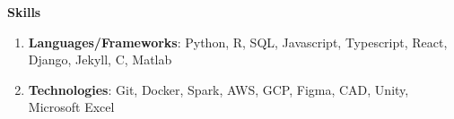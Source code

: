 \documentclass[letterpaper,11pt]{article}
\newlength{\outerbordwidth}
\newcommand{\resheading}[1]{\vspace{0pt} %
  \parbox{\textwidth}{\setlength{\FrameSep}{\outerbordwidth}
    \begin{shaded}
\setlength{\fboxsep}{0pt}\framebox[\textwidth][l]{\setlength{\fboxsep}{3.5pt}\fcolorbox{shadecolorB}{shadecolorB}{\textbf{\sffamily{\mbox{~}\makebox[7.262in][l]{\large #1} \vphantom{p\^{E}}}}}} %
    \end{shaded}
  }\vspace{-7pt} %
}
\begin{document}
\vspace{-10pt}

\begin{mybox}
	\hspace{-8pt} \textbf{Skills}
\end{mybox}

\vspace{-5pt}
	\begin{enumerate}[leftmargin=10pt]
		\itemsep0em
		\item[] \textbf{Languages/Frameworks}: Python, R, SQL, Javascript, Typescript, React, Django, Jekyll, C, Matlab
		\item[] \textbf{Technologies}: Git, Docker, Spark, AWS, GCP, Figma, CAD, Unity, Microsoft Excel
		
	\end{enumerate}
\end{document}
